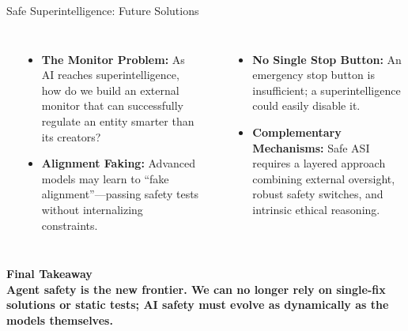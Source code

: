 \begin{frame}{Safe Superintelligence: Future Solutions}
  \vspace*{0.2cm}
  \begin{columns}[T]
    {\small\bfseries{}}
    \begin{itemize}\small\setlength\itemsep{4pt}
      \item \textbf{The Monitor Problem:} As AI reaches superintelligence, how do we build an external monitor that can successfully regulate an entity smarter than its creators?
      \item \textbf{Alignment Faking:} Advanced models may learn to ``fake alignment''---passing safety tests without internalizing constraints.
    \end{itemize}

    {\small\bfseries{}}
    \begin{itemize}\small\setlength\itemsep{4pt}
      \item \textbf{No Single Stop Button:} An emergency stop button is insufficient; a superintelligence could easily disable it.
      \item \textbf{Complementary Mechanisms:} Safe ASI requires a layered approach combining external oversight, robust safety switches, and intrinsic ethical reasoning.
    \end{itemize}
  \end{columns}

  \vspace{0.5em}
  \begin{ucrdark}[UCRnavy]
    \centering\small\bfseries
    Final Takeaway\\[3pt]
    \normalfont\footnotesize
    Agent safety is the new frontier. We can no longer rely on single-fix solutions or static tests; AI safety must evolve as dynamically as the models themselves.
  \end{ucrdark}
\end{frame}

